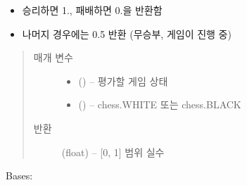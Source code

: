 \documentclass[letterpaper,10pt,english]{sphinxmanual}
\begin{document}
\begin{fulllineitems}
\begin{fulllineitems}
\begin{itemize}
\item {} 
승리하면 1., 패배하면 0.을 반환함

\item {} 
나머지 경우에는 0.5 반환 (무승부, 게임이 진행 중)

\end{itemize}
\begin{quote}\begin{description}
\item[{매개 변수}] \leavevmode\begin{itemize}
\item {} 
 ({\hyperref[\detokenize{scripts:scripts.run_game.State}]{}}) -- 평가할 게임 상태

\item {} 
 () -- chess.WHITE 또는 chess.BLACK

\end{itemize}

\item[{반환}] \leavevmode
(float) -- {[}0, 1{]} 범위 실수

\end{description}\end{quote}

\end{fulllineitems}


\end{fulllineitems}


\begin{fulllineitems}
\label{\detokenize{scripts:scripts.run_game.Move}}
Bases: 

\end{fulllineitems}

\end{document}
